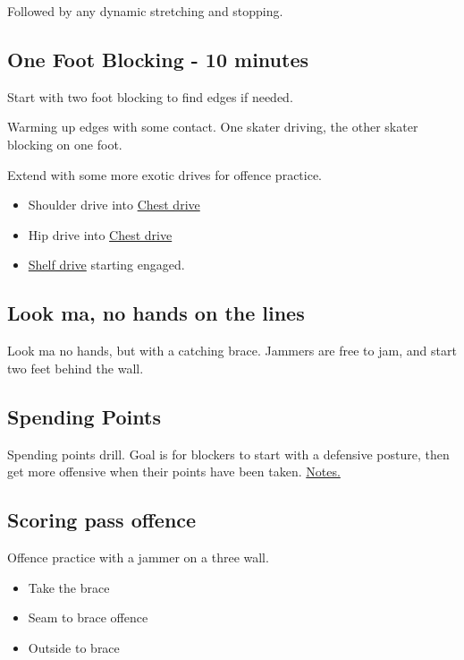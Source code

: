 \documentclass{journal}
\begin{document}
Followed by any dynamic stretching and stopping. 

\subsection*{One Foot Blocking - 10 minutes}

Start with two foot blocking to find edges if needed.

Warming up edges with some contact. 
One skater driving, the other skater blocking on one foot. 

Extend with some more exotic drives for offence practice. 

\begin{itemize}
\item Shoulder drive into \hyperref[drill:drives/chest]{Chest drive}
\item Hip drive into \hyperref[drill:drives/chest]{Chest drive}
\item \hyperref[drill:drives/shelf]{Shelf drive} starting engaged.
\end{itemize}




\subsection*{Look ma, no hands on the lines}

Look ma no hands, but with a catching brace. 
Jammers are free to jam, and start two feet behind the wall. 

\subsection*{Spending Points}

Spending points drill.
Goal is for blockers to start with a defensive posture, then get more offensive when their points have been taken.
\hyperref[drill:points/spending]{Notes.}

\subsection*{Scoring pass offence}

Offence practice with a jammer on a three wall.

\begin{itemize}
\item Take the brace 
\item Seam to brace offence
\item Outside to brace
\end{itemize}
\end{document}
